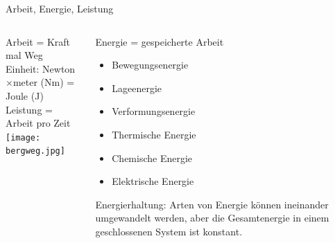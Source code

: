 \documentclass{beamer}
\begin{document}

\begin{frame}{Arbeit, Energie, Leistung}
    
    \begin{columns}
\begin{column}{5cm}
Arbeit = Kraft  mal Weg \\
Einheit: Newton\(\times\)meter (Nm) = Joule (J)  \\
\pause
Leistung = Arbeit pro Zeit \\


\texttt{[image: bergweg.jpg]}


\end{column}    
\pause


\begin{column}{5cm}
Energie = gespeicherte Arbeit \\


\begin{itemize}
\item
Bewegungsenergie 
\item
Lageenergie 
\item
Verformungsenergie
\item
Thermische Energie
\item
Chemische Energie
\item
Elektrische Energie
\end{itemize}

Energierhaltung: Arten von Energie können ineinander umgewandelt werden, aber die Gesamtenergie in einem geschlossenen System ist konstant. 

\end{column}    

    \end{columns}
    
\end{frame}

\end{document}
